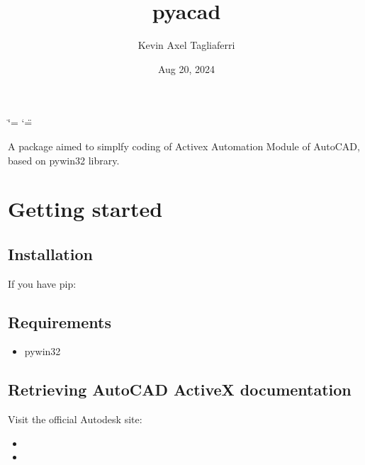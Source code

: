 \documentclass[a4paper,10pt,english]{sphinxmanual}
\title{pyacad}
\date{Aug 20, 2024}
\author{Kevin Axel Tagliaferri}
\begin{document}
\ifdefined\shorthandoff
  \ifnum\catcode`\=\string=\active\shorthandoff{=}\fi
  \ifnum\catcode`\"=\active{}\fi
\fi

\pagestyle{empty}
\sphinxmaketitle
\pagestyle{plain}
\sphinxtableofcontents
\pagestyle{normal}
\label{\detokenize{index::doc}}


\sphinxAtStartPar
A package aimed to simplfy coding of Activex Automation Module of AutoCAD, based on pywin32 library.

\sphinxstepscope


\chapter{Getting started}
\label{\detokenize{gettingstarted:getting-started}}\label{\detokenize{gettingstarted::doc}}

\section{Installation}
\label{\detokenize{gettingstarted:installation}}
\sphinxAtStartPar
If you have pip:

\begin{sphinxVerbatim}[commandchars=\\\{\}]
  
\end{sphinxVerbatim}


\section{Requirements}
\label{\detokenize{gettingstarted:requirements}}\begin{itemize}
\item {} 
\sphinxAtStartPar
pywin32

\end{itemize}


\section{Retrieving AutoCAD ActiveX documentation}
\label{\detokenize{gettingstarted:retrieving-autocad-activex-documentation}}
\sphinxAtStartPar
Visit the official Autodesk site:
\begin{itemize}
\item {} 
\sphinxAtStartPar
{}

\item {} 
\sphinxAtStartPar
{}

\end{itemize}
\end{document}
